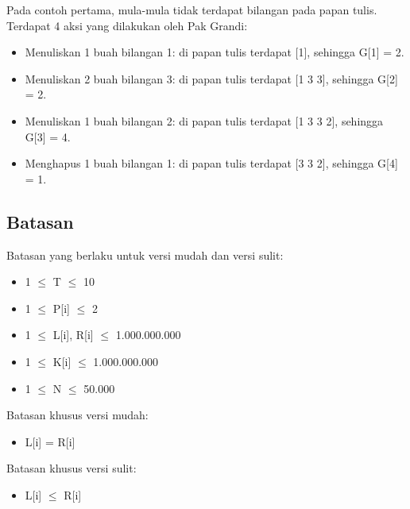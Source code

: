 \documentclass[../main_problemset.tex]{subfiles} %
\begin{document}
Pada contoh pertama, mula-mula tidak terdapat bilangan pada papan tulis. Terdapat 4 aksi yang dilakukan oleh Pak Grandi:

\begin{itemize}
	\item Menuliskan 1 buah bilangan 1: di papan tulis terdapat [1], sehingga G[1] = 2.
	\item Menuliskan 2 buah bilangan 3: di papan tulis terdapat [1 3 3], sehingga G[2] = 2.
	\item Menuliskan 1 buah bilangan 2: di papan tulis terdapat [1 3 3 2], sehingga G[3] = 4.
	\item Menghapus 1 buah bilangan 1: di papan tulis terdapat [3 3 2], sehingga G[4] = 1.
\end{itemize}

\subsection*{Batasan}

\begin{minipage}[t]{0.47\textwidth}

Batasan yang berlaku untuk versi mudah dan versi sulit:

\begin{itemize}
	\item 1 $ \leq $ T $ \leq $ 10
	\item 1 $ \leq $ P[i] $ \leq $ 2
	\item 1 $ \le $ L[i], R[i] $ \le $ 1.000.000.000
	\item 1 $ \le $ K[i] $ \le $ 1.000.000.000
	\item 1 $ \le $ N $ \le $ 50.000
\end{itemize}
\end{minipage}
\begin{minipage}[t]{0.06\textwidth}
	\hfill
\end{minipage}
\begin{minipage}[t]{0.47\textwidth}
Batasan khusus versi mudah:
\begin{itemize}
	\item L[i] = R[i]
\end{itemize}

\vspace{.2cm}

Batasan khusus versi sulit:
\begin{itemize}
	\item L[i] $ \le $ R[i]
\end{itemize}
\end{minipage}
\end{document}
